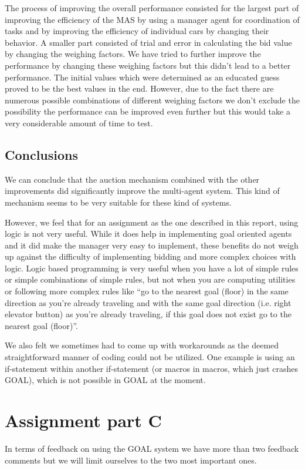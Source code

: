 \documentclass[a4paper,11pt]{article}
\begin{document}
The process of improving the overall performance consisted for the largest part of improving the efficiency of the MAS by using a manager agent for coordination of tasks and by improving the efficiency of individual cars by changing their behavior. A smaller part consisted of trial and error in calculating the bid value by changing the weighing factors. We have tried to further improve the performance by changing these weighing factors but this didn't lead to a better performance. The initial values which were determined as an educated guess proved to be the best values in the end. However, due to the fact there are numerous possible combinations of different weighing factors we don't exclude the possibility the performance can be improved even further but this would take a very considerable amount of time to test. 

\subsection{Conclusions}
We can conclude that the auction mechanism combined with the other improvements did significantly improve the multi-agent system. This kind of mechanism seems to be very suitable for these kind of systems.

However, we feel that for an assignment as the one described in this report, using logic is not very useful. While it does help in implementing goal oriented agents and it did make the manager very easy to implement, these benefits do not weigh up against the difficulty of implementing bidding and more complex choices with logic. Logic based programming is very useful when you have a lot of simple rules or simple combinations of simple rules, but not when you are computing utilities or following more complex rules like ``go to the nearest goal (floor) in the same direction as you're already traveling and with the same goal direction (i.e. right elevator button) as you're already traveling, if this goal does not exist go to the nearest goal (floor)''.

We also felt we sometimes had to come up with workarounds as the deemed straightforward manner of coding could not be utilized. One example is using an if-statement within another if-statement (or macros in macros, which just crashes GOAL), which is not possible in GOAL at the moment. 

\section{Assignment part C}
In terms of feedback on using the GOAL system we have more than two feedback comments but we will limit ourselves to the two most important ones. 
\end{document}
